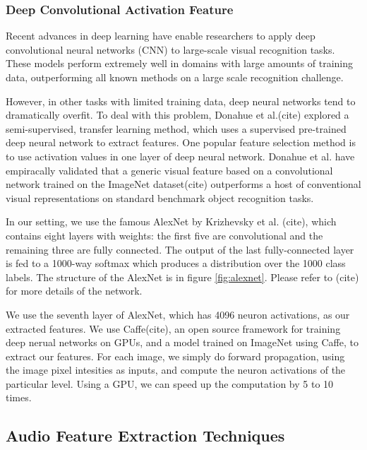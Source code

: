 \documentclass{article}
\begin{document}
\subsubsection{Deep Convolutional Activation Feature}
Recent advances in deep learning have enable researchers to apply deep convolutional neural networks (CNN) to large-scale visual recognition tasks. These models perform extremely well in domains with large amounts of training data, outperforming all known methods on a large scale recognition challenge.\par
However, in other tasks with limited training data, deep neural networks tend to dramatically overfit. To deal with this problem, Donahue et al.(cite) explored a semi-supervised, transfer learning method, which uses a supervised pre-trained deep neural network to extract features. One popular feature selection method is to use activation values in one layer of deep neural network. Donahue et al. have empiracally validated that a generic visual feature based on a convolutional network trained on the ImageNet dataset(cite) outperforms a host of conventional visual representations on standard benchmark object recognition tasks.\par
In our setting, we use the famous AlexNet by Krizhevsky et al. (cite), which contains eight layers with weights: the first five are convolutional and the remaining three are fully connected. The output of the last fully-connected layer is fed to a 1000-way softmax which produces a distribution over the 1000 class labels. The structure of the AlexNet is in figure \ref{fig:alexnet}. Please refer to (cite) for more details of the network. \par


We use the seventh layer of AlexNet, which has 4096 neuron activations, as our extracted features. We use Caffe(cite), an open source framework for training deep nerual networks on GPUs, and a model trained on ImageNet using Caffe, to extract our features. For each image, we simply do forward propagation, using the image pixel intesities as inputs, and compute the neuron activations of the particular level. Using a GPU, we can speed up the computation by 5 to 10 times.

\subsection{Audio Feature Extraction Techniques}
\end{document}
